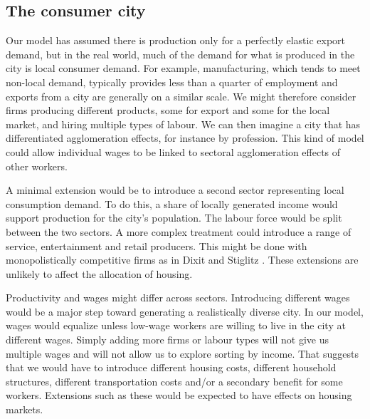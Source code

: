 

\subsection{The consumer city}
Our model has assumed there is production only for a perfectly elastic export demand, but in the real world, much of the demand for what is produced in the city is local consumer demand.  For example, manufacturing, which tends to meet non-local demand, typically provides less than a quarter of employment and exports from a city are generally on a similar scale. 
We might therefore consider firms producing different products, some for export and some for the local market, and hiring multiple types of labour. We can then imagine a city that has differentiated agglomeration effects, for instance by profession. This kind of model could allow individual wages to be linked to sectoral agglomeration effects of other workers. %

A minimal extension would be to introduce a second sector representing local consumption demand. To do this, a share of locally generated income would support production for the city's population. The labour force would be split between the two sectors. A more complex treatment could introduce a range of service, entertainment and retail producers. This might be done with monopolistically competitive firms as in Dixit and Stiglitz \cite{AvinashK.Dixit1977MCaO}. These extensions are unlikely to affect the allocation of housing.

Productivity and wages might differ across sectors. Introducing different wages would be a major step toward generating a realistically diverse city. In our model, wages would equalize unless low-wage workers are willing to live in the city at different wages. Simply adding more firms or labour types will not give us multiple wages and will not allow us to explore sorting by income. That suggests that we would have to introduce different housing costs, different household structures, different transportation costs and/or a secondary benefit for some workers.  Extensions such as these would be expected to have effects on housing markets. %

